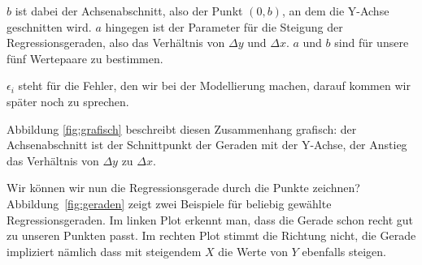 \documentclass[ngerman, 12pt]{scrartcl}
\begin{document}
\(b\) ist dabei der Achsenabschnitt, also der Punkt \((0,b)\), an dem die Y-Achse geschnitten wird. $a$ hingegen ist der Parameter für die Steigung der Regressionsgeraden, also das Verhältnis von $\Delta y$ und $\Delta x$. $a$ und $b$ sind für unsere fünf Wertepaare zu bestimmen. 

\(\epsilon_i\) steht für die Fehler, den wir bei der Modellierung machen, darauf kommen wir später noch zu sprechen. 

Abbildung \ref{fig:grafisch} beschreibt diesen Zusammenhang grafisch: der Achsenabschnitt ist der Schnittpunkt der Geraden mit der Y-Achse, der Anstieg das Verhältnis von \(\Delta y\) zu \(\Delta x\).

Wir können wir nun die Regressionsgerade durch die Punkte zeichnen? Abbildung~\ref{fig:geraden} zeigt zwei Beispiele für beliebig gewählte Regressionsgeraden. Im linken Plot erkennt man, dass die Gerade schon recht gut zu unseren Punkten passt. Im rechten Plot stimmt die Richtung nicht, die Gerade impliziert nämlich dass mit steigendem $X$ die Werte von $Y$ ebenfalls steigen.
\end{document}

